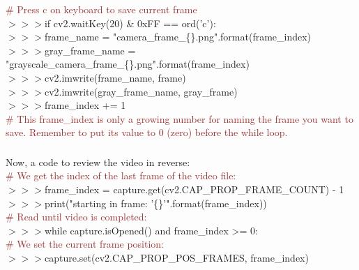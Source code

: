 \documentclass[a4paper,18pt]{article}
\begin{document}
{{{{{{\textcolor{brown}{\# Press c on keyboard to save current frame}}\\
\hspace*{14pt}$>>>$if cv2.waitKey(20) \& 0xFF == ord('c'):\\
\hspace*{14pt}$>>>$frame\_name = "camera\_frame\_\{\}.png".format(frame\_index)\\
\hspace*{14pt}$>>>$gray\_frame\_name = "grayscale\_camera\_frame\_\{\}.png".format(frame\_index)\\
\hspace*{14pt}$>>>$cv2.imwrite(frame\_name, frame)\\
\hspace*{14pt}$>>>$cv2.imwrite(gray\_frame\_name, gray\_frame)\\
\hspace*{14pt}$>>>$frame\_index += 1\\{\textcolor{brown}{\# This frame\_index is only a growing number for naming the frame you want to save. Remember to put its value to 0 (zero) before the while loop.}}\\


\subsubsection{\colorbox {important}{\color{white}{\large How to backward-play a video }}}
Now, a code to review the video in reverse:\\

{\textcolor{brown}{\# We get the index of the last frame of the video file:}\\
\hspace*{14pt}$>>>$frame\_index = capture.get(cv2.CAP\_PROP\_FRAME\_COUNT) - 1\\
\hspace*{14pt}$>>>$print("starting in frame: '\{\}'".format(frame\_index))\\

{\textcolor{brown}{\# Read until video is completed:}\\
\hspace*{14pt}$>>>$while capture.isOpened() and frame\_index >= 0:\\

{\textcolor{brown}{\# We set the current frame position:}\\
\hspace*{14pt}$>>>$\hspace*{28pt}capture.set(cv2.CAP\_PROP\_POS\_FRAMES, frame\_index)\\

}}}}}}}}
\end{document}

